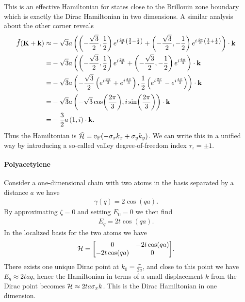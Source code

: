 This is an effective Hamiltonian for states close to the Brillouin zone boundary which is exactly the Dirac Hamiltonian in two dimensions. A similar analysis about the other corner reveals
\begin{align*}
	\tilde{f}(\vb{K} + \vb{k}) \approx& -\sqrt{3}a\left(\left(-\frac{\sqrt{3}}{2}, \frac{1}{2}\right)e^{i\frac{4\pi}{3}\left(\frac{3}{4} - \frac{1}{4}\right)} + \left(-\frac{\sqrt{3}}{2}, -\frac{1}{2}\right)e^{i\frac{4\pi}{3}\left(\frac{3}{4} + \frac{1}{4}\right)}\right)\cdot\vb{k} \\
	=& -\sqrt{3}a\left(\left(-\frac{\sqrt{3}}{2}, \frac{1}{2}\right)e^{i\frac{2\pi}{3}} + \left(-\frac{\sqrt{3}}{2}, -\frac{1}{2}\right)e^{i\frac{4\pi}{3}}\right)\cdot\vb{k} \\
	=& -\sqrt{3}a\left(-\frac{\sqrt{3}}{2}\left(e^{i\frac{2\pi}{3}} + e^{i\frac{4\pi}{3}}\right), \frac{1}{2}\left(e^{i\frac{2\pi}{3}} - e^{i\frac{4\pi}{3}}\right)\right)\cdot\vb{k} \\
	=& -\sqrt{3}a\left(-\sqrt{3}\cos(\frac{2\pi}{3}), i\sin(\frac{2\pi}{3})\right)\cdot\vb{k} \\
	=& -\frac{3}{2}a\left(1, i\right)\cdot\vb{k}.
\end{align*}
Thus the Hamiltonian is $\tilde{\mathcal{H}} = v_{\text{F}}(-\sigma_{x}k_{x} + \sigma_{y}k_{y})$. We can write this in a unified way by introducing a so-called valley degree-of-freedom index $\tau_{z} = \pm 1$.

\paragraph{Polyacetylene}
Consider a one-dimensional chain with two atoms in the basis separated by a distance $a$ we have
\begin{align*}
	\gamma(q) = 2\cos(qa).
\end{align*}
By approximating $\zeta = 0$ and setting $E_{0} = 0$ we then find
\begin{align*}
	E_{q} = 2t\cos(qa).
\end{align*}
In the localized basis for the two atoms we have
\begin{align*}
	\ham = \mqty[
		0          & -2t\cos(qa) \\
		-2t\cos(qa) & 0
	].
\end{align*}
There exists one unique Dirac point at $k_{0} = \frac{\pi}{2a}$, and close to this point we have $E_{q} \approx 2taq$, hence the Hamiltonian in terms of a small displacement $k$ from the Dirac point becomes $\mathcal{H} \approx 2ta\sigma_{x}k$. This is the Dirac Hamiltonian in one dimension.

